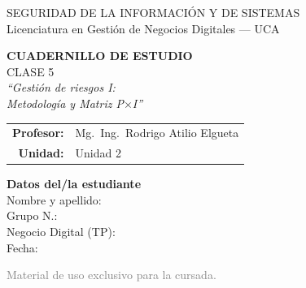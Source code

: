 \documentclass[12pt,a4paper]{article}
\begin{document}
\begin{titlepage}
\centering
\vspace*{1cm}

\begin{cajaTitulo}[width=\textwidth, halign=center]
  SEGURIDAD DE LA INFORMACI\'ON Y DE SISTEMAS\\[4pt]
  {\large Licenciatura en Gesti\'on de Negocios Digitales --- UCA}
\end{cajaTitulo}

\vspace{1.5cm}

{\Huge\bfseries\color{azulUCA} CUADERNILLO DE ESTUDIO}\\[8pt]
{\LARGE\color{doradoUCA} CLASE 5}\\[12pt]
{\Large\itshape ``Gesti\'on de riesgos I:\\[2pt] Metodología y Matriz P$\times$I''}\\[1.5cm]

\begin{tabular}{rl}
\textbf{Profesor:}   & Mg.\ Ing.\ Rodrigo Atilio Elgueta \\[4pt]
\textbf{Unidad:}     & Unidad 2 \\[4pt]
\end{tabular}

\vfill

\begin{tcolorbox}[colback=grisClaro, colframe=azulUCA, arc=3mm, width=0.9\textwidth]
  \centering
  {\bfseries Datos del/la estudiante}\\[10pt]
  Nombre y apellido: \underline{\hspace{5cm}}\\[10pt]
  Grupo N.\textdegree: \underline{\hspace{5cm}}\\[10pt]
  Negocio Digital (TP): \underline{\hspace{5cm}}\\[10pt]
  Fecha: \underline{\hspace{5cm}}
\end{tcolorbox}

\vspace{1cm}
{\small\textcolor{gray}{Material de uso exclusivo para la cursada.}}
\end{titlepage}

\tableofcontents
\newpage
\end{document}
